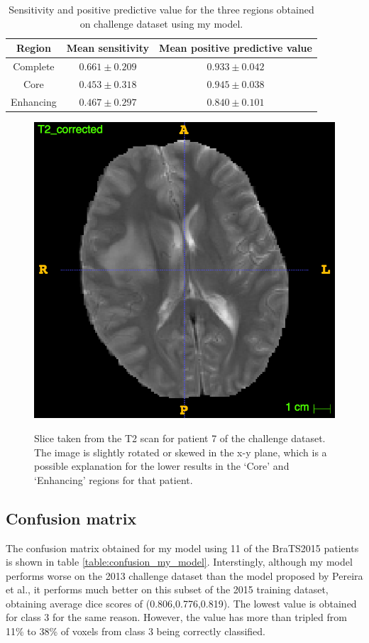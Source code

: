 \documentclass[12pt,a4paper,twoside,openright]{report}
\begin{document}
\begin{table}
\centering	
\begin{tabular}{ c | c | c} 
\textbf{Region} & \textbf{Mean sensitivity } & \textbf{Mean positive predictive value} \\
\hline
Complete &	$0.661 \pm 0.209$ & $0.933 \pm 0.042$ \\
Core & 		$0.453 \pm 0.318$ & $0.945 \pm 0.038$ \\
Enhancing & $0.467 \pm 0.297$ & $0.840 \pm 0.101$ \\
\end{tabular}
\caption{Sensitivity and positive predictive value for the three regions obtained on challenge dataset using my model.}
\label{table:my_model_sensitivity_ppv}
\end{table}

\begin{figure}[h]
	\centering
	\includegraphics[scale = 0.3]{patient7_t2}
	\label{fig:patient_7_t2}
	\caption{Slice taken from the T2 scan for patient 7 of the challenge dataset. The image is slightly rotated or skewed in the x-y plane, which is a possible explanation for the lower results in the `Core' and `Enhancing' regions for that patient.}
\end{figure}

\subsection{Confusion matrix}
The confusion matrix obtained for my model using 11 of the BraTS2015 patients is shown in table \ref{table:confusion_my_model}. Interstingly, although my model performs worse on the 2013 challenge dataset than the model proposed by Pereira et al., it performs much better on this subset of the 2015 training dataset, obtaining average dice scores of (0.806,0.776,0.819). The lowest value is obtained for class 3 for the same reason. However, the value has more than tripled from 11\% to 38\% of voxels from class 3 being correctly classified.
\end{document}
